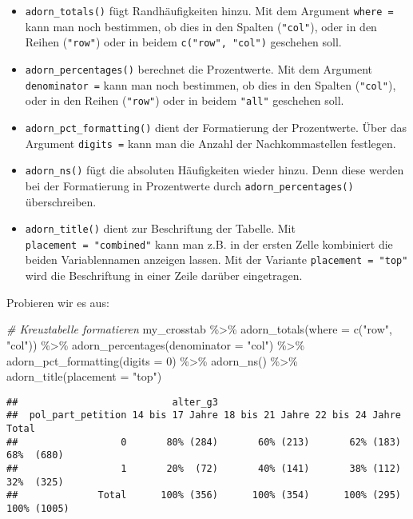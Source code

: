 \documentclass[
]{book}
\newenvironment{Shaded}{\begin{snugshade}}{\end{snugshade}}
\newcommand{\AttributeTok}[1]{\textcolor[rgb]{0.77,0.63,0.00}{#1}}
\newcommand{\CommentTok}[1]{\textcolor[rgb]{0.56,0.35,0.01}{\textit{#1}}}
\newcommand{\DecValTok}[1]{\textcolor[rgb]{0.00,0.00,0.81}{#1}}
\newcommand{\FunctionTok}[1]{\textcolor[rgb]{0.00,0.00,0.00}{#1}}
\newcommand{\NormalTok}[1]{#1}
\newcommand{\SpecialCharTok}[1]{\textcolor[rgb]{0.00,0.00,0.00}{#1}}
\newcommand{\StringTok}[1]{\textcolor[rgb]{0.31,0.60,0.02}{#1}}
\begin{document}
\begin{itemize}
\item
  \texttt{adorn\_totals()} fügt Randhäufigkeiten hinzu. Mit dem Argument \texttt{where\ =} kann man noch bestimmen, ob dies in den Spalten (\texttt{"col"}), oder in den Reihen (\texttt{"row"}) oder in beidem \texttt{c("row",\ "col")} geschehen soll.
\item
  \texttt{adorn\_percentages()} berechnet die Prozentwerte. Mit dem Argument \texttt{denominator\ =} kann man noch bestimmen, ob dies in den Spalten (\texttt{"col"}), oder in den Reihen (\texttt{"row"}) oder in beidem \texttt{"all"} geschehen soll.
\item
  \texttt{adorn\_pct\_formatting()} dient der Formatierung der Prozentwerte. Über das Argument \texttt{digits\ =} kann man die Anzahl der Nachkommastellen festlegen.
\item
  \texttt{adorn\_ns()} fügt die absoluten Häufigkeiten wieder hinzu. Denn diese werden bei der Formatierung in Prozentwerte durch \texttt{adorn\_percentages()} überschreiben.
\item
  \texttt{adorn\_title()} dient zur Beschriftung der Tabelle. Mit \texttt{placement\ =\ "combined"} kann man z.B. in der ersten Zelle kombiniert die beiden Variablennamen anzeigen lassen. Mit der Variante \texttt{placement\ =\ "top"} wird die Beschriftung in einer Zeile darüber eingetragen.
\end{itemize}

Probieren wir es aus:

\begin{Shaded}
\begin{Highlighting}[]
\CommentTok{\# Kreuztabelle formatieren}
\NormalTok{my\_crosstab }\SpecialCharTok{\%\textgreater{}\%} 
  \FunctionTok{adorn\_totals}\NormalTok{(}\AttributeTok{where =} \FunctionTok{c}\NormalTok{(}\StringTok{"row"}\NormalTok{, }\StringTok{"col"}\NormalTok{)) }\SpecialCharTok{\%\textgreater{}\%}
  \FunctionTok{adorn\_percentages}\NormalTok{(}\AttributeTok{denominator =} \StringTok{"col"}\NormalTok{) }\SpecialCharTok{\%\textgreater{}\%} 
  \FunctionTok{adorn\_pct\_formatting}\NormalTok{(}\AttributeTok{digits =} \DecValTok{0}\NormalTok{) }\SpecialCharTok{\%\textgreater{}\%}
  \FunctionTok{adorn\_ns}\NormalTok{() }\SpecialCharTok{\%\textgreater{}\%}
  \FunctionTok{adorn\_title}\NormalTok{(}\AttributeTok{placement =} \StringTok{"top"}\NormalTok{)}
\end{Highlighting}
\end{Shaded}

\begin{verbatim}
##                           alter_g3                                            
##  pol_part_petition 14 bis 17 Jahre 18 bis 21 Jahre 22 bis 24 Jahre       Total
##                  0       80% (284)       60% (213)       62% (183)  68%  (680)
##                  1       20%  (72)       40% (141)       38% (112)  32%  (325)
##              Total      100% (356)      100% (354)      100% (295) 100% (1005)
\end{verbatim}
\end{document}
